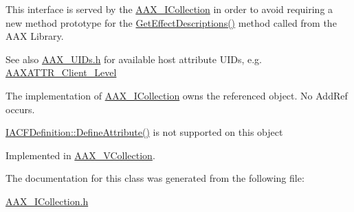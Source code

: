 This interface is served by the \hyperlink{a00087}{A\+A\+X\+\_\+\+I\+Collection} in order to avoid requiring a new method prototype for the \hyperlink{a00326_gae0d356eef326f77cbb972e48946d4892}{Get\+Effect\+Descriptions()} method called from the A\+A\+X Library.

\begin{DoxySeeAlso}{See also}
\hyperlink{a00299}{A\+A\+X\+\_\+\+U\+I\+Ds.\+h} for available host attribute U\+I\+Ds, e.\+g. \hyperlink{a00299_a1bbc82d62cf23079e92826874381a891}{A\+A\+X\+A\+T\+T\+R\+\_\+\+Client\+\_\+\+Level}
\end{DoxySeeAlso}
The implementation of \hyperlink{a00087}{A\+A\+X\+\_\+\+I\+Collection} owns the referenced object. No Add\+Ref occurs.

\hyperlink{a00145_abf9f28b14b95f0835857a9096d108989}{I\+A\+C\+F\+Definition\+::\+Define\+Attribute()} is not supported on this object 

Implemented in \hyperlink{a00130_a7622e015fa99c8504d42f99181b1d473}{A\+A\+X\+\_\+\+V\+Collection}.



The documentation for this class was generated from the following file\+:\begin{DoxyCompactItemize}
\item 
\hyperlink{a00236}{A\+A\+X\+\_\+\+I\+Collection.\+h}\end{DoxyCompactItemize}
